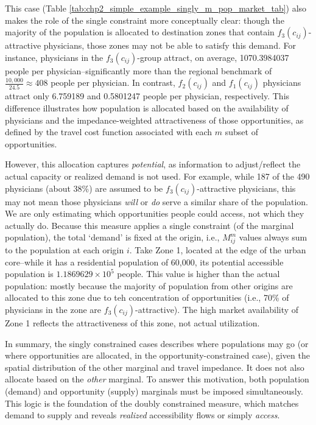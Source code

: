 \documentclass[
11pt, %
oneside, %
english, %
singlespacing, %
]{macthesis} %
\begin{document}


This case (Table \ref{tab:chp2_simple_example_singly_m_pop_market_tab}) also makes the role of the single constraint more conceptually clear: though the majority of the population is allocated to destination zones that contain \(f_3(c_{ij})\)-attractive physicians, those zones may not be able to satisfy this demand. For instance, physicians in the \(f_3(c_{ij})\)-group attract, on average, 1070.3984037 people per physician--significantly more than the regional benchmark of \(\frac{10,000}{24.5} \approx 408\) people per physician. In contrast, \(f_2(c_{ij})\) and \(f_1(c_{ij})\) physicians attract only 6.759189 and 0.5801247 people per physician, respectively. This difference illustrates how population is allocated based on the availability of physicians and the impedance-weighted attractiveness of those opportunities, as defined by the travel cost function associated with each \(m\) subset of opportunities.

However, this allocation captures \emph{potential}, as information to adjust/reflect the actual capacity or realized demand is not used. For example, while 187 of the 490 physicians (about 38\%) are assumed to be \(f_3(c_{ij})\)-attractive physicians, this may not mean those physicians \emph{will} or \emph{do} serve a similar share of the population. We are only estimating which opportunities people could access, not which they actually do. Because this measure applies a single constraint (of the marginal population), the total `demand' is fixed at the origin, i.e., \(M_{ij}^m\) values always sum to the population at each origin \(i\). Take Zone 1, located at the edge of the urban core--while it has a residential population of 60,000, its potential accessible population is \ensuremath{1.1869629\times 10^{5}} people. This value is higher than the actual population: mostly because the majority of population from other origins are allocated to this zone due to teh concentration of opportunities (i.e., 70\% of physicians in the zone are \(f_3(c_{ij})\)-attractive). The high market availability of Zone 1 reflects the attractiveness of this zone, not actual utilization.

In summary, the singly constrained cases describes where populations may go (or where opportunities are allocated, in the opportunity-constrained case), given the spatial distribution of the other marginal and travel impedance. It does not also allocate based on the \emph{other} marginal. To answer this motivation, both population (demand) and opportunity (supply) marginals must be imposed simultaneously. This logic is the foundation of the doubly constrained measure, which matches demand to supply and reveals \emph{realized} accessibility flows or simply \emph{access}.
\end{document}
